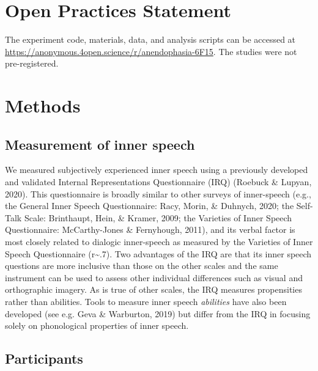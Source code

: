 \documentclass[
  man,a4paper,floatsintext]{apa6}
\begin{document}
\hypertarget{open-practices-statement}{%
\section{Open Practices Statement}\label{open-practices-statement}}

The experiment code, materials, data, and analysis scripts can be accessed at \url{https://anonymous.4open.science/r/anendophasia-6F15}. The studies were not pre-registered.

\hypertarget{methods}{%
\section{Methods}\label{methods}}

\hypertarget{measurement-of-inner-speech}{%
\subsection{Measurement of inner speech}\label{measurement-of-inner-speech}}

We measured subjectively experienced inner speech using a previously developed and validated Internal Representations Questionnaire (IRQ) (Roebuck \& Lupyan, 2020). This questionnaire is broadly similar to other surveys of inner-speech (e.g., the General Inner Speech Questionnaire: Racy, Morin, \& Duhnych, 2020; the Self-Talk Scale: Brinthaupt, Hein, \& Kramer, 2009; the Varieties of Inner Speech Questionnaire: McCarthy-Jones \& Fernyhough, 2011), and its verbal factor is most closely related to dialogic inner-speech as measured by the Varieties of Inner Speech Questionnaire (r\textasciitilde.7). Two advantages of the IRQ are that its inner speech questions are more inclusive than those on the other scales and the same instrument can be used to assess other individual differences such as visual and orthographic imagery. As is true of other scales, the IRQ measures propensities rather than abilities. Tools to measure inner speech \emph{abilities} have also been developed (see e.g. Geva \& Warburton, 2019) but differ from the IRQ in focusing solely on phonological properties of inner speech.

\hypertarget{participants}{%
\subsection{Participants}\label{participants}}
\end{document}
